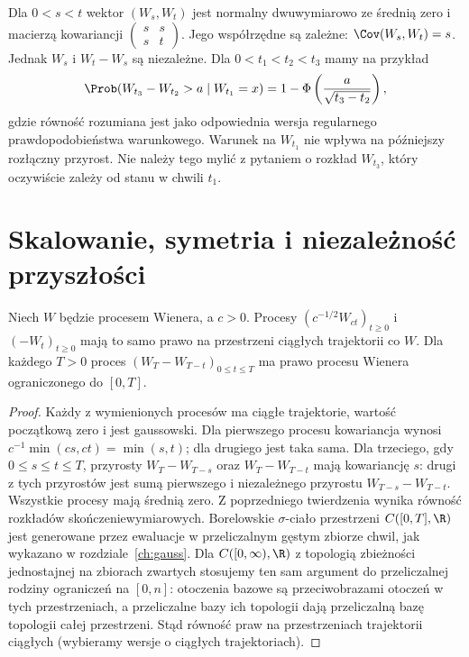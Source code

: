 \begin{przyklad}
Dla $0<s<t$ wektor $(W_s,W_t)$ jest normalny dwuwymiarowo
ze średnią zero i macierzą kowariancji
$\left(\begin{smallmatrix}s&s\\s&t\end{smallmatrix}\right)$.
Jego współrzędne są zależne: $\Cov(W_s,W_t)=s$.
Jednak $W_s$ i $W_t-W_s$ są niezależne.
Dla $0<t_1<t_2<t_3$ mamy na przykład
\[
\Prob(W_{t_3}-W_{t_2}>a\mid W_{t_1}=x)
=1-\Phi\left(\frac{a}{\sqrt{t_3-t_2}}\right),
\]
gdzie równość rozumiana jest jako odpowiednia wersja
regularnego prawdopodobieństwa warunkowego.
Warunek na $W_{t_1}$ nie wpływa na późniejszy rozłączny przyrost.
Nie należy tego mylić z pytaniem o rozkład $W_{t_3}$,
który oczywiście zależy od stanu w chwili $t_1$.
\end{przyklad}

\section{Skalowanie, symetria i niezależność przyszłości}
\begin{twierdzenie}
Niech $W$ będzie procesem Wienera, a $c>0$.
Procesy $(c^{-1/2}W_{ct})_{t\ge0}$ i
$(-W_t)_{t\ge0}$ mają to samo prawo na przestrzeni
ciągłych trajektorii co $W$. Dla każdego $T>0$ proces
$(W_T-W_{T-t})_{0\le t\le T}$ ma prawo procesu Wienera
ograniczonego do $[0,T]$.
\end{twierdzenie}
\begin{proof}
Każdy z wymienionych procesów ma ciągłe trajektorie,
wartość początkową zero i jest gaussowski.
Dla pierwszego procesu kowariancja wynosi
$c^{-1}\min(cs,ct)=\min(s,t)$; dla drugiego
jest taka sama. Dla trzeciego, gdy $0\le s\le t\le T$,
przyrosty $W_T-W_{T-s}$ oraz $W_T-W_{T-t}$ mają
kowariancję $s$: drugi z tych przyrostów jest sumą
pierwszego i niezależnego przyrostu $W_{T-s}-W_{T-t}$.
Wszystkie procesy mają średnią zero. Z poprzedniego
twierdzenia wynika równość rozkładów skończeniewymiarowych.
Borelowskie $\sigma$-ciało przestrzeni $C([0,T],\R)$
jest generowane przez ewaluacje w przeliczalnym gęstym
zbiorze chwil, jak wykazano w rozdziale~\ref{ch:gauss}.
Dla $C([0,\infty),\R)$ z topologią zbieżności jednostajnej
na zbiorach zwartych stosujemy ten sam argument do
przeliczalnej rodziny ograniczeń na $[0,n]$: otoczenia
bazowe są przeciwobrazami otoczeń w tych przestrzeniach,
a przeliczalne bazy ich topologii dają przeliczalną
bazę topologii całej przestrzeni. Stąd równość praw
na przestrzeniach trajektorii ciągłych (wybieramy wersje
o ciągłych trajektoriach).
\end{proof}

